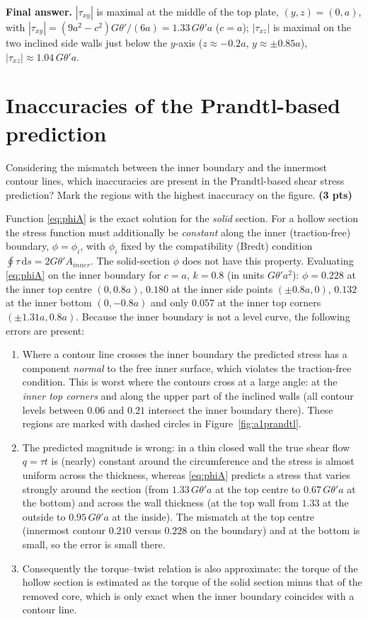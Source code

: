 \bigskip
\noindent\textbf{Final answer.} $|\tau_{xy}|$ is maximal at the middle of the top plate, $(y,z)=(0,a)$, with $|\tau_{xy}|=(9a^2-c^2)G\theta'/(6a)=1.33\,G\theta'a$ ($c=a$); $|\tau_{xz}|$ is maximal on the two inclined side walls just below the $y$-axis ($z\approx-0.2a$, $y\approx\pm0.85a$), $|\tau_{xz}|\approx1.04\,G\theta'a$.

\section{Inaccuracies of the Prandtl-based prediction}

Considering the mismatch between the inner boundary and the innermost contour lines, which inaccuracies are present in the Prandtl-based shear stress prediction? Mark the regions with the highest inaccuracy on the figure. \textbf{(3 pts)}

\bigskip
Function \eqref{eq:phiA} is the exact solution for the \emph{solid} section. For a hollow section the stress function must additionally be \emph{constant} along the inner (traction-free) boundary, $\phi=\phi_i$, with $\phi_i$ fixed by the compatibility (Bredt) condition $\oint\tau\,\mathrm{d}s=2G\theta'A_{inner}$. The solid-section $\phi$ does not have this property. Evaluating \eqref{eq:phiA} on the inner boundary for $c=a$, $k=0.8$ (in units $G\theta'a^2$): $\phi=0.228$ at the inner top centre $(0,0.8a)$, $0.180$ at the inner side points $(\pm0.8a,0)$, $0.132$ at the inner bottom $(0,-0.8a)$ and only $0.057$ at the inner top corners $(\pm1.31a,0.8a)$. Because the inner boundary is not a level curve, the following errors are present:
\begin{enumerate}[label=(\roman*)]
  \item Where a contour line crosses the inner boundary the predicted stress has a component \emph{normal} to the free inner surface, which violates the traction-free condition. This is worst where the contours cross at a large angle: at the \emph{inner top corners} and along the upper part of the inclined walls (all contour levels between $0.06$ and $0.21$ intersect the inner boundary there). These regions are marked with dashed circles in Figure~\ref{fig:a1prandtl}.
  \item The predicted magnitude is wrong: in a thin closed wall the true shear flow $q=\tau t$ is (nearly) constant around the circumference and the stress is almost uniform across the thickness, whereas \eqref{eq:phiA} predicts a stress that varies strongly around the section (from $1.33\,G\theta'a$ at the top centre to $0.67\,G\theta'a$ at the bottom) and across the wall thickness (at the top wall from $1.33$ at the outside to $0.95\,G\theta'a$ at the inside). The mismatch at the top centre (innermost contour $0.210$ versus $0.228$ on the boundary) and at the bottom is small, so the error is small there.
  \item Consequently the torque--twist relation is also approximate: the torque of the hollow section is estimated as the torque of the solid section minus that of the removed core, which is only exact when the inner boundary coincides with a contour line.
\end{enumerate}

